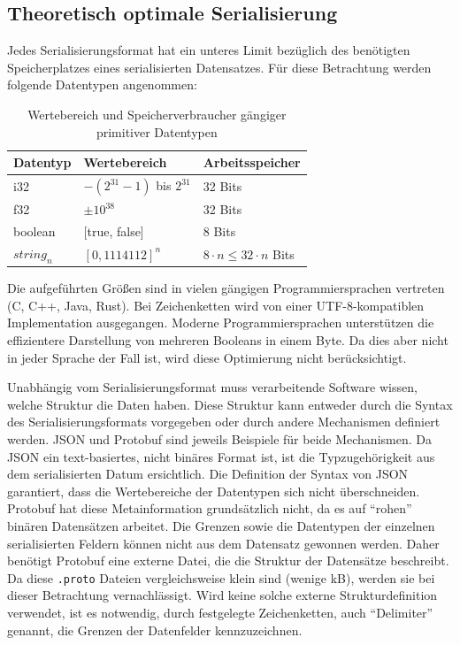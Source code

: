 \documentclass[ngerman]{seminarvorlage}
\begin{document}
\subsection{Theoretisch optimale Serialisierung}

Jedes Serialisierungsformat hat ein unteres Limit bezüglich des benötigten Speicherplatzes eines serialisierten Datensatzes. Für diese Betrachtung werden folgende Datentypen angenommen: 

\begin{table}[h]
  \centering
  \begin{tabular}{|l|l|l|} 
  \hline
  Datentyp  & Wertebereich               & Arbeitsspeicher                    \\ 
  \hline
  i32         & $-\left(2^{31}-1\right)$ bis $2^{31}$  & 32 Bits              \\
  f32         & $\pm 10^{38}$              & 32 Bits                          \\
  boolean     & {[}true, false]            & 8 Bits                           \\
  $string_n$  & $[0, 1114112]^n$           & $8 \cdot n \leq 32 \cdot n$ Bits \\
  \hline
  \end{tabular}
  \caption{Wertebereich und Speicherverbraucher gängiger primitiver Datentypen}
\end{table}

Die aufgeführten Größen sind in vielen gängigen Programmiersprachen vertreten (C, C++, Java, Rust). Bei Zeichenketten wird von einer UTF-8-kompatiblen Implementation ausgegangen. Moderne Programmiersprachen unterstützen die effizientere Darstellung von mehreren Booleans in einem Byte. Da dies aber nicht in jeder Sprache der Fall ist, wird diese Optimierung nicht berücksichtigt.

Unabhängig vom Serialisierungsformat muss verarbeitende Software wissen, welche Struktur die Daten haben. Diese Struktur kann entweder durch die Syntax des Serialisierungsformats vorgegeben oder durch andere Mechanismen definiert werden. JSON und Protobuf sind jeweils Beispiele für beide Mechanismen. Da JSON ein text-basiertes, nicht binäres Format ist, ist die Typzugehörigkeit aus dem serialisierten Datum ersichtlich. Die Definition der Syntax von JSON garantiert, dass die Wertebereiche der Datentypen sich nicht überschneiden. Protobuf hat diese Metainformation grundsätzlich nicht, da es auf ``rohen'' binären Datensätzen arbeitet. Die Grenzen sowie die Datentypen der einzelnen serialisierten Feldern können nicht aus dem Datensatz gewonnen werden. Daher benötigt Protobuf eine externe Datei, die die Struktur der Datensätze beschreibt. Da diese \texttt{.proto} Dateien vergleichsweise klein sind (wenige kB), werden sie bei dieser Betrachtung vernachlässigt. Wird keine solche externe Strukturdefinition verwendet, ist es notwendig, durch festgelegte Zeichenketten, auch ``Delimiter'' genannt, die Grenzen der Datenfelder kennzuzeichnen.
\end{document}
